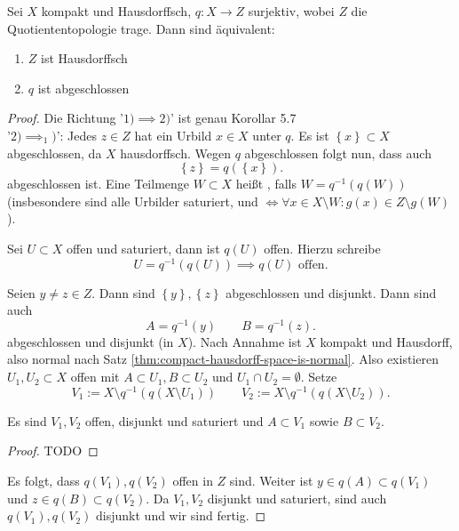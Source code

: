 \begin{theorem}
    Sei $X$ kompakt und Hausdorffsch, $q: X \to  Z$ surjektiv, wobei  $Z$ die Quotiententopologie trage. Dann sind äquivalent: 
    \begin{enumerate}[1)]
        \item $Z$ ist Hausdorffsch
        \item  $q$ ist abgeschlossen
    \end{enumerate}
    \label{thm:quotient-space-of-compact-hausdorff-space}
\end{theorem}
\begin{proof}
    Die Richtung '$1) \implies 2)$' ist genau Korollar 5.7  \\
    '$2)\implies_1)$': Jedes $z\in Z$ hat ein Urbild $x\in X$ unter $q$. Es ist  $\left \{x\right\} \subset X$ abgeschlossen, da $X$ hausdorffsch. Wegen  $q$ abgeschlossen folgt nun, dass auch
    \[
        \left \{z\right\}  = q(\left \{x\right\} )
    .\] 
    abgeschlossen ist. Eine Teilmenge $W\subset X$ heißt , falls $W = q^{-1}(q(W))$ (insbesondere sind alle Urbilder saturiert, und $\iff  \forall x\in X \setminus W : g(x) \in Z \setminus g(W)$). \\
\begin{remark}
    Sei $U\subset X$ offen und saturiert, dann ist $q(U)$ offen. Hierzu schreibe
    \[
        U = q^{-1}(q(U)) \implies q(U) \text{ offen}
    .\] 
\end{remark}
Seien $y\neq z\in Z$. Dann sind $\left \{y\right\} ,\left \{z\right\} $ abgeschlossen und disjunkt. Dann sind auch
\[
    A = q^{-1}(y) \qquad B = q^{-1}(z)
.\] 
abgeschlossen und disjunkt (in  $X$). Nach Annahme ist  $X$ kompakt und Hausdorff, also normal nach Satz \ref{thm:compact-hausdorff-space-is-normal}. Also existieren  $U_1,U_2\subset X$ offen mit $A\subset U_1,B\subset U_2$ und $U_1 \cap U_2 = \emptyset$. Setze
\[
    V_1 := X \setminus q^{-1}(q(X\setminus U_1)) \qquad V_2 := X \setminus q^{-1}(q(X\setminus U_2))
.\] 
\begin{claim}
    Es sind $V_1,V_2$ offen, disjunkt und saturiert und $A\subset V_1$ sowie $B\subset V_2$.
\end{claim}
\begin{proof}
    TODO
\end{proof}
Es folgt, dass $q(V_1),q(V_2)$ offen in $Z$ sind. Weiter ist  $y\in q(A)\subset q(V_1)$ und $z\in q(B) \subset q(V_2)$. Da $V_1,V_2$ disjunkt und saturiert, sind auch $q(V_1),q(V_2)$ disjunkt und wir sind fertig.
\end{proof}
